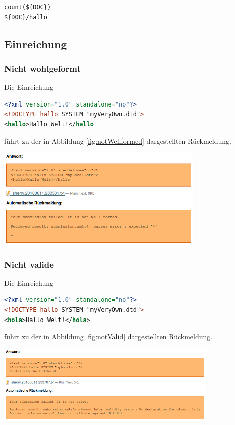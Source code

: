 \documentclass[a4paper]{scrartcl}
\begin{document}
\begin{lstlisting}[language=XML, captionpos=b, frame=tlRB, caption={Beispiel XPath-Ausdrücke.}]
count(${DOC})
${DOC}/hallo
\end{lstlisting}
	  
	  \subsection{Einreichung}
  	  \subsubsection{Nicht wohlgeformt}
  	  Die Einreichung
  	  \begin{lstlisting}[language=XML, captionpos=b, frame=tlRB, caption={Nicht wohlgeformte Einreichung.}]
<?xml version="1.0" standalone="no"?>
<!DOCTYPE hallo SYSTEM "myVeryOwn.dtd">
<hallo>Hallo Welt!</hallo
\end{lstlisting}
  	  führt zu der in Abbildung \ref{fig:notWellformed} dargestellten Rückmeldung.
  	  \begin{center}
	      \includegraphics[width=0.75\textwidth]{images/notWellformed.png}
	      \label{fig:notWellformed}
      \end{center}
  	  
  	  \subsubsection{Nicht valide}
  	  Die Einreichung
  	  \begin{lstlisting}[language=XML, captionpos=b, frame=tlRB, caption={Nicht valide Einreichung.}]
<?xml version="1.0" standalone="no"?>
<!DOCTYPE hallo SYSTEM "myVeryOwn.dtd">
<hola>Hallo Welt!</hola>
\end{lstlisting}
  	  führt zu der in Abbildung \ref{fig:notValid} dargestellten Rückmeldung.
  	  \begin{center}
	      \includegraphics[width=0.8\textwidth]{images/notValid.png}
	      \label{fig:notValid}
      \end{center}
  	  
\end{document}
